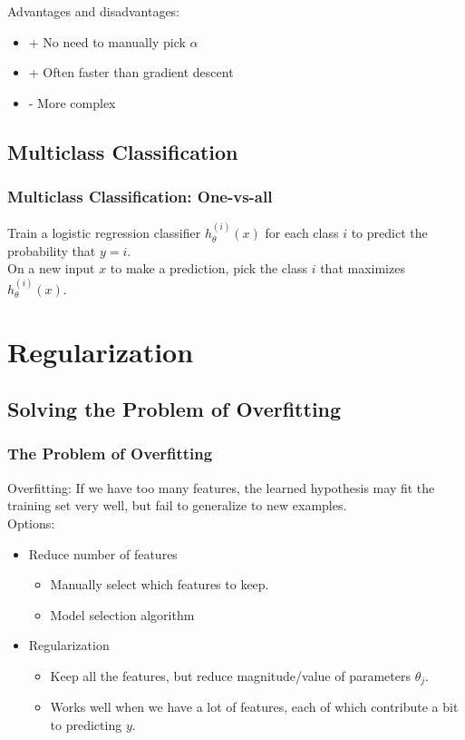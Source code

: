 \documentclass{article}
\begin{document}
Advantages and disadvantages:
\begin{itemize}
  \item + No need to manually pick $\alpha$
  \item + Often faster than gradient descent
  \item - More complex
\end{itemize}

\subsection{Multiclass Classification}
\subsubsection{Multiclass Classification: One-vs-all}
Train a logistic regression classifier $h_\theta^{(i)}(x)$ for each class $i$ to predict the probability that $y = i$.\\

On a new input $x$ to make a prediction, pick the class $i$ that maximizes $h_\theta^{(i)}(x)$.

\newpage

\section{Regularization}
\subsection{Solving the Problem of Overfitting}
\subsubsection{The Problem of Overfitting}
Overfitting: If we have too many features, the learned hypothesis may fit the training set very well, but fail to generalize to new examples. \\

Options:
\begin{itemize}
  \item Reduce number of features
  \begin{itemize}
    \item Manually select which features to keep.
    \item Model selection algorithm
  \end{itemize}
  
  \item Regularization
  \begin{itemize}
    \item Keep all the features, but reduce magnitude/value of parameters $\theta_j$.
    \item Works well when we have a lot of features, each of which contribute a bit to predicting $y$.
  \end{itemize}
\end{itemize}
\end{document}
